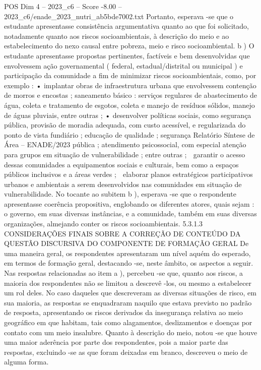 \begin{textsample}{POS Dim 4 – 2023\_c6 – Score -8.00 – 2023\_c6/enade\_2023\_nutri\_ab5bde7002.txt}
Portanto, esperava -se que o estudante apresentasse consistência argumentativa quanto ao que foi solicitado, notadamente quanto aos riscos socioambientais, à descrição do meio e ao estabelecimento do nexo causal entre pobreza, meio e risco socioambiental. b ) O estudante apresentasse propostas pertinentes, factíveis e bem desenvolvidas que envolvessem ação governamental ( federal, estadual/distrital ou municipal ) e participação da comunidade a fim de minimizar riscos socioambientais, como, por exemplo : • implantar obras de infraestrutura urbana que envolvessem contenção de morros e encostas ; saneamento básico : serviços regulares de abastecimento de água, coleta e tratamento de esgotos, coleta e manejo de resíduos sólidos, manejo de águas pluviais, entre outras ; • desenvolver políticas sociais, como segurança pública, provisão de moradia adequada, com custo acessível, e regularizada do ponto de vista fundiário ; educação de qualidade ; segurança Relatório Síntese de Área – ENADE/2023 pública ; atendimento psicossocial, com especial atenção para grupos em situação de vulnerabilidade ; entre outras ;  garantir o acesso dessas comunidades a equipamentos sociais e culturais, bem como a espaços públicos inclusivos e a áreas verdes ;  elaborar planos estratégicos participativos urbanos e ambientais a serem desenvolvidos nas comunidades em situação de vulnerabilidade.
No tocante ao subitem b ), esperava -se que o respondente apresentasse coerência propositiva, englobando os diferentes atores, quais sejam : o governo, em suas diversas instâncias, e a comunidade, também em suas diversas organizações, almejando conter os riscos socioambientais. 5.3.1.3 CONSIDERAÇÕES FINAIS SOBRE A CORREÇÃO DE CONTEÚDO DA QUESTÃO DISCURSIVA DO COMPONENTE DE FORMAÇÃO GERAL De uma maneira geral, os respondentes apresentaram um nível aquém do esperado, em termos de formação geral, destacando -se, neste âmbito, os aspectos a seguir.
Nas respostas relacionadas ao item a ), percebeu -se que, quanto aos riscos, a maioria dos respondentes não se limitou a descrevê -los, ou mesmo a estabelecer um rol deles.
No caso daqueles que descreveram as diversas situações de risco, em sua maioria, as respostas se enquadraram naquilo que estava previsto no padrão de resposta, apresentando os riscos derivados da insegurança relativa ao meio geográfico em que habitam, tais como alagamentos, deslizamentos e doenças por contato com um meio insalubre.
Quanto à descrição do meio, notou -se que houve uma maior aderência por parte dos respondentes, pois a maior parte das respostas, excluindo -se as que foram deixadas em branco, descreveu o meio de alguma forma.

\end{textsample}
